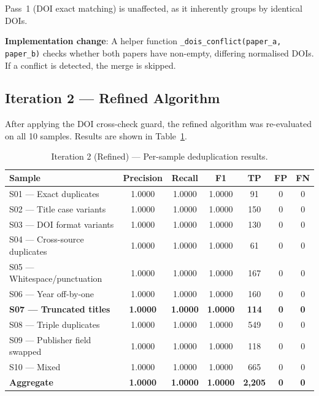 \documentclass[conference]{IEEEtran}
\begin{document}
Pass~1 (DOI exact matching) is unaffected, as it inherently groups by identical DOIs.

\textbf{Implementation change}: A helper function \texttt{\_dois\_conflict(paper\_a, paper\_b)} checks whether both papers have non-empty, differing normalised DOIs. If a conflict is detected, the merge is skipped.

\subsection{Iteration 2 --- Refined Algorithm}

After applying the DOI cross-check guard, the refined algorithm was re-evaluated on all 10 samples. Results are shown in Table~\ref{tab:iter2}.

\begin{table}[htbp]
\centering
\caption{Iteration 2 (Refined) --- Per-sample deduplication results.}
\label{tab:iter2}
\begin{tabular}{@{}lcccccc@{}}
\toprule
\textbf{Sample} & \textbf{Precision} & \textbf{Recall} & \textbf{F1} & \textbf{TP} & \textbf{FP} & \textbf{FN} \\
\midrule
S01 --- Exact duplicates        & 1.0000 & 1.0000 & 1.0000 &  91 & 0 & 0 \\
S02 --- Title case variants     & 1.0000 & 1.0000 & 1.0000 & 150 & 0 & 0 \\
S03 --- DOI format variants     & 1.0000 & 1.0000 & 1.0000 & 130 & 0 & 0 \\
S04 --- Cross-source duplicates & 1.0000 & 1.0000 & 1.0000 &  61 & 0 & 0 \\
S05 --- Whitespace/punctuation  & 1.0000 & 1.0000 & 1.0000 & 167 & 0 & 0 \\
S06 --- Year off-by-one         & 1.0000 & 1.0000 & 1.0000 & 160 & 0 & 0 \\
\textbf{S07 --- Truncated titles} & \textbf{1.0000} & \textbf{1.0000} & \textbf{1.0000} & \textbf{114} & \textbf{0} & \textbf{0} \\
S08 --- Triple duplicates       & 1.0000 & 1.0000 & 1.0000 & 549 & 0 & 0 \\
S09 --- Publisher field swapped & 1.0000 & 1.0000 & 1.0000 & 118 & 0 & 0 \\
S10 --- Mixed                   & 1.0000 & 1.0000 & 1.0000 & 665 & 0 & 0 \\
\midrule
\textbf{Aggregate} & \textbf{1.0000} & \textbf{1.0000} & \textbf{1.0000} & \textbf{2{,}205} & \textbf{0} & \textbf{0} \\
\bottomrule
\end{tabular}
\end{table}
\end{document}
